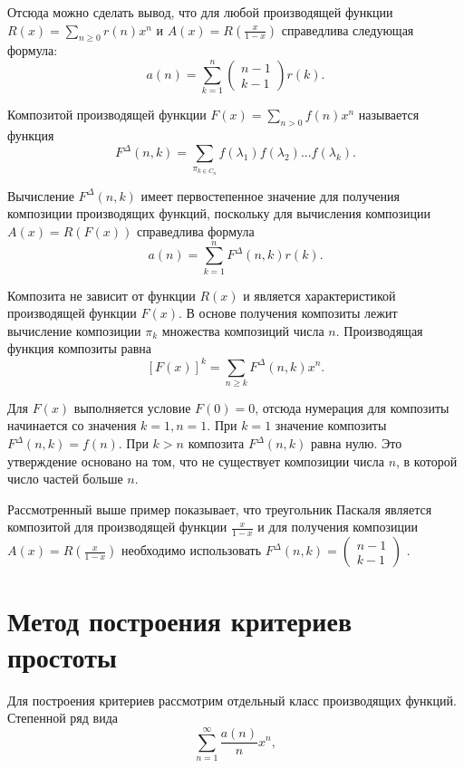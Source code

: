 \documentclass[
russian,
cp1251,
14pt,
simple
]{eskdtext}
\theoremstyle{definition}
\begin{document}
Отсюда можно сделать вывод, что для любой производящей функции $R(x)=\sum\limits _{n\ge 0}r(n)x^{n}  $ и $A(x)=R(\frac{x}{1-x} )$ справедлива следующая формула:
$$
a(n)=\sum\limits _{k=1}^{n}\left(\begin{array}{c} {n-1} \\ {k-1} \end{array}\right)r(k) .     
$$

Композитой производящей функции $F(x)=\sum\limits _{n>0}f(n)x^{n}  $ называется функция \cite{KruchininVV}
$$
F^{\Delta } (n,k)=\sum\limits _{\pi _{k\in C_{n} } }f(\lambda _{1} )f(\lambda _{2} )...f(\lambda _{k} ) .  
$$

Вычисление $F^{\Delta } (n,k)$ имеет первостепенное значение для получения композиции производящих функций, поскольку для вычисления композиции $A(x)=R(F(x))$ справедлива формула
$$
a(n)=\sum\limits _{k=1}^{n}F^{\Delta } (n,k)r(k) .  
$$

Композита не зависит от функции $R(x)$ и является характеристикой производящей функции $F(x)$. В основе получения композиты лежит вычисление композиции $\pi _{k} $ множества композиций числа $n$. Производящая функция композиты равна
$$
[F(x)]^{k} =\sum\limits _{n\ge k}F^{\Delta } (n,k)x^{n}  .  
$$

Для $F(x)$ выполняется условие $F(0)=0$, отсюда нумерация для композиты начинается со значения $k=1,n=1$. При $k=1$ значение композиты $F^{\Delta } (n,k)=f(n)$. При  $k>n$ композита $F^{\Delta } (n,k)$ равна нулю. Это утверждение основано на том, что не существует композиции числа $n$, в которой число частей больше $n$.

Рассмотренный выше пример показывает, что треугольник Паскаля является композитой для производящей функции $\frac{x}{1-x} $ и для получения композиции $A(x)=R(\frac{x}{1-x} )$ необходимо использовать $F^{\Delta } (n,k)=\left(\begin{array}{c} {n-1} \\ {k-1} \end{array}\right)$ \cite{GrKnPa,KruchininVV}.

\newpage
\section{Метод построения критериев простоты}

Для построения критериев рассмотрим отдельный класс производящих функций. Степенной ряд вида
$$
\sum\limits _{n=1}^{\infty }\frac{a(n) }{n} x^{n}  ,                                 
$$
\end{document}
